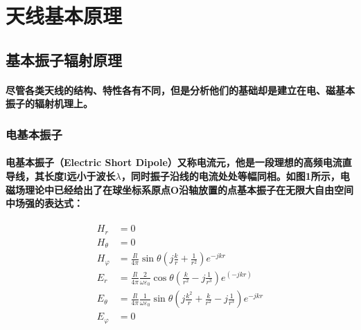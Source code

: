 \documentclass[UTF8]{ctexart}
\begin{document}
\section{天线基本原理}
\subsection{基本振子辐射原理}
\paragraph{尽管各类天线的结构、特性各有不同，但是分析他们的基础却是建立在电、磁基本振子的辐射机理上。}
\subsubsection{电基本振子}
\paragraph{电基本振子（Electric Short Dipole）又称电流元，他是一段理想的高频电流直导线，其长度l远小于波长$\lambda$，同时振子沿线的电流处处等幅同相。如图1所示，电磁场理论中已经给出了在球坐标系原点O沿轴放置的点基本振子在无限大自由空间中场强的表达式：}
\begin{align}
H_{r} & = 0 \\ H_{\theta} & = 0 \\ H_{\varphi} & = \frac{Il}{4\pi}\sin \theta(j\frac{k}{r}+\frac{1}{r^2})e^{-jkr}\\
E_{r} & = \frac{Il}{4\pi}\frac{2}{\omega \varepsilon_{0}}\cos \theta(\frac{k}{r^2}-j\frac{1}{r^3})e^(-jkr)\\
E_{\theta} & = \frac{Il}{4\pi}\frac{1}{\omega \varepsilon_{0}}\sin \theta(j\frac{k^2}{r}+\frac{k}{r^2}-j\frac{1}{r^3})e^{-jkr} \\
E_{\varphi} & = 0
\end{align}
\end{document}
